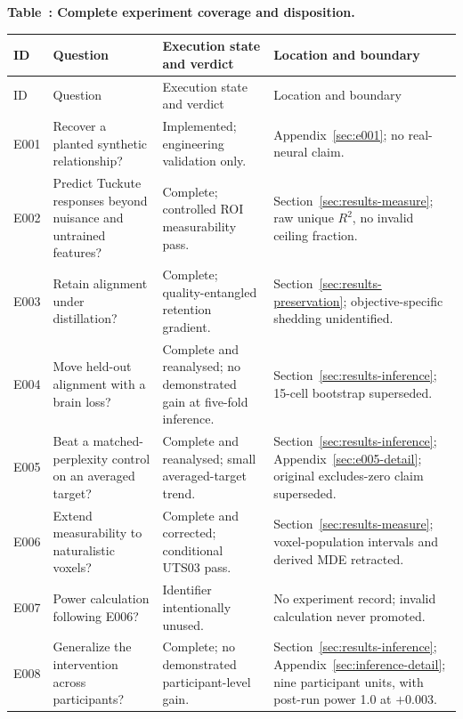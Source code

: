 \begingroup
\footnotesize
\sloppy
\setlength{\tabcolsep}{3pt}
\setlength{\LTleft}{0pt}
\setlength{\LTright}{0pt}
\setlength{\LTcapwidth}{\textwidth}
\label{tab:coverage}
\begin{center}
\textbf{Table~\thetable: Complete experiment coverage and disposition.}
\end{center}
\begin{longtable}{p{}p{}p{}p{}} %
\toprule
ID & Question & Execution state and verdict & Location and boundary \\
\midrule
\endfirsthead
\toprule
ID & Question & Execution state and verdict & Location and boundary \\
\midrule
\endhead
E001 & Recover a planted synthetic relationship? & Implemented; engineering validation only. & Appendix~\ref{sec:e001}; no real-neural claim. \\
E002 & Predict Tuckute responses beyond nuisance and untrained features? & Complete; controlled ROI measurability pass. & Section~\ref{sec:results-measure}; raw unique $R^2$, no invalid ceiling fraction. \\
E003 & Retain alignment under distillation? & Complete; quality-entangled retention gradient. & Section~\ref{sec:results-preservation}; objective-specific shedding unidentified. \\
E004 & Move held-out alignment with a brain loss? & Complete and reanalysed; no demonstrated gain at five-fold inference. & Section~\ref{sec:results-inference}; 15-cell bootstrap superseded. \\
E005 & Beat a matched-perplexity control on an averaged target? & Complete and reanalysed; small averaged-target trend. & Section~\ref{sec:results-inference}; Appendix~\ref{sec:e005-detail}; original excludes-zero claim superseded. \\
E006 & Extend measurability to naturalistic voxels? & Complete and corrected; conditional UTS03 pass. & Section~\ref{sec:results-measure}; voxel-population intervals and derived MDE retracted. \\
E007 & Power calculation following E006? & Identifier intentionally unused. & No experiment record; invalid calculation never promoted. \\
E008 & Generalize the intervention across participants? & Complete; no demonstrated participant-level gain. & Section~\ref{sec:results-inference}; Appendix~\ref{sec:inference-detail}; nine participant units, with post-run power 1.0 at $+0.003$. \\

\end{longtable}
